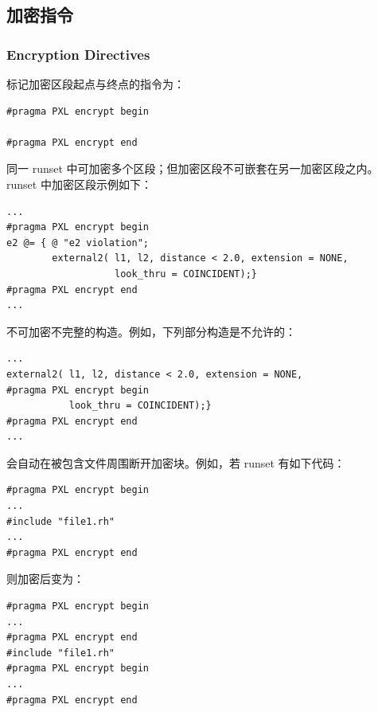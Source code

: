 \subsection{加密指令}
\subsubsection*{Encryption Directives}

标记加密区段起点与终点的指令为：
\begin{lstlisting}[style=pxl]
#pragma PXL encrypt begin

#pragma PXL encrypt end
\end{lstlisting}

同一 runset 中可加密多个区段；但加密区段不可嵌套在另一加密区段之内。runset 中加密区段示例如下：
\begin{lstlisting}[style=pxl]
...
#pragma PXL encrypt begin
e2 @= { @ "e2 violation";
        external2( l1, l2, distance < 2.0, extension = NONE,
                   look_thru = COINCIDENT);}
#pragma PXL encrypt end
...
\end{lstlisting}

不可加密不完整的构造。例如，下列部分构造是不允许的：
\begin{lstlisting}[style=pxl]
...
external2( l1, l2, distance < 2.0, extension = NONE,
#pragma PXL encrypt begin
           look_thru = COINCIDENT);}
#pragma PXL encrypt end
...
\end{lstlisting}

 会自动在被包含文件周围断开加密块。例如，若 runset 有如下代码：
\begin{lstlisting}[style=pxl]
#pragma PXL encrypt begin
...
#include "file1.rh"
...
#pragma PXL encrypt end
\end{lstlisting}

则加密后变为：
\begin{lstlisting}[style=pxl]
#pragma PXL encrypt begin
...
#pragma PXL encrypt end
#include "file1.rh"
#pragma PXL encrypt begin
...
#pragma PXL encrypt end
\end{lstlisting}
